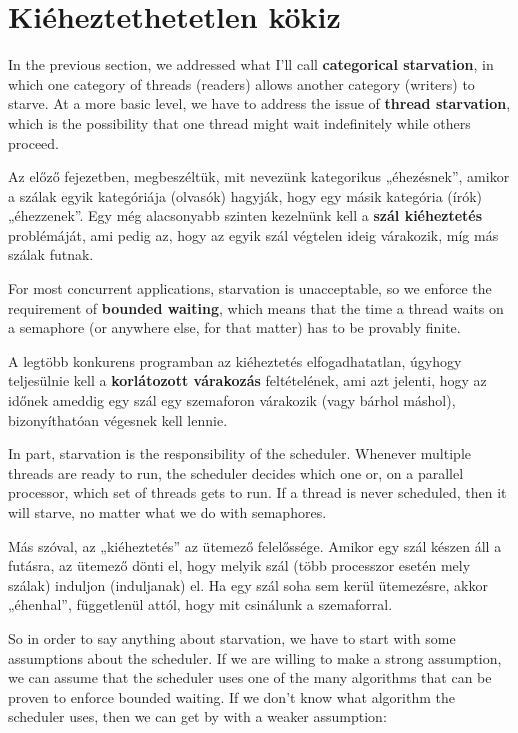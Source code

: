 \documentclass{book}
\newcommand{\clearemptydoublepage}{\newpage\cleardoublepage}
\begin{document}
\clearemptydoublepage
\section{Kiéheztethetetlen kökiz}
\label{props}

In the previous section, we addressed what I'll call
{\bf categorical starvation}, in which one category of threads
(readers) allows another category (writers) to starve.
At a more basic level, we have to address the issue of
{\bf thread starvation}, which is the possibility that one
thread might wait indefinitely while others proceed.

Az előző fejezetben, megbeszéltük, mit nevezünk kategorikus „éhezésnek”,
amikor a szálak egyik kategóriája (olvasók) hagyják, hogy egy másik
kategória (írók) „éhezzenek”. Egy még alacsonyabb szinten kezelnünk kell
a {\bf szál kiéheztetés} problémáját, ami pedig az, hogy az egyik szál végtelen
ideig várakozik, míg más szálak futnak. 

For most concurrent applications, starvation is unacceptable,
so we enforce the requirement of {\bf bounded waiting}, which
means that the time a thread waits on a semaphore (or anywhere
else, for that matter) has to be provably finite.

A legtöbb konkurens programban az kiéheztetés elfogadhatatlan, úgyhogy
teljesülnie kell a {\bf korlátozott várakozás} feltételének, ami azt jelenti, hogy az időnek
ameddig egy szál egy szemaforon várakozik (vagy bárhol máshol),
bizonyíthatóan végesnek kell lennie.

In part, starvation is the responsibility of the scheduler.
Whenever multiple threads are ready to run, the scheduler decides
which one or, on a parallel processor, which set of threads gets
to run.  If a thread is never scheduled, then it will starve,
no matter what we do with semaphores.

Más szóval, az „kiéheztetés” az ütemező felelőssége. Amikor egy szál készen
áll a futásra, az ütemező dönti el, hogy melyik szál (több processzor esetén
mely szálak) induljon (induljanak) el. Ha egy szál soha sem kerül ütemezésre,
akkor „éhenhal”, függetlenül attól, hogy mit csinálunk a szemaforral.

So in order to say anything about starvation, we have to start
with some assumptions about the scheduler.  If we are willing
to make a strong assumption, we can assume that the scheduler
uses one of the many algorithms that can be proven to enforce
bounded waiting.  If we don't know what algorithm the scheduler
uses, then we can get by with a weaker assumption:
\end{document}

